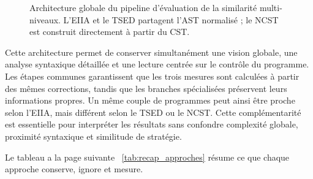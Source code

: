 {\begin{figure}[H]
{%
}
\caption{Architecture globale du pipeline d'évaluation de la similarité
multi-niveaux. L'EIIA et le TSED partagent l'AST normalisé ; le NCST est
construit directement à partir du CST.}
\label{fig:pipeline_global}
\end{figure}

Cette architecture permet de conserver simultanément une vision globale,
une analyse syntaxique détaillée et une lecture centrée sur le contrôle du
programme. Les étapes communes garantissent que les trois mesures sont
calculées à partir des mêmes corrections, tandis que les branches spécialisées
préservent leurs informations propres. Un même couple de programmes peut ainsi
être proche selon l'EIIA, mais différent selon le TSED ou le NCST. Cette
complémentarité est essentielle pour interpréter les résultats sans confondre
complexité globale, proximité syntaxique et similitude de stratégie.

Le tableau a la page suivante ~\ref{tab:recap_approches} résume ce que chaque approche conserve,
ignore et mesure.

}
